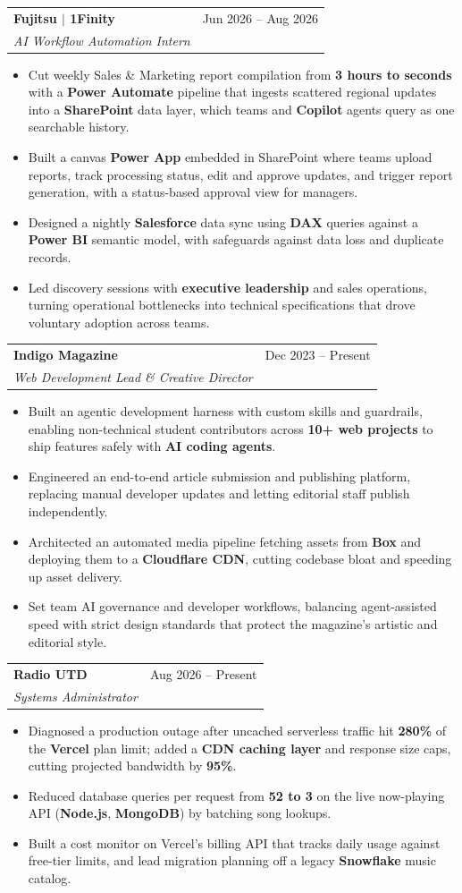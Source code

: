 \documentclass[letterpaper,11pt]{article}
\makeatletter
\newcommand{\resumeItem}[1]{\item\small{{#1 \vspace{-2pt}}}}
\newcommand{\resumeSubheading}[4]{
  \vspace{-2pt}\item
    \begin{tabular*}{0.97\textwidth}[t]{l@{\extracolsep{\fill}}r}
      \textbf{#1} & #2 \\
      \textit{\small#3} & \textit{\small #4} \\
    \end{tabular*}\vspace{-7pt}
}
\newcommand{\resumeItemListStart}{\begin{itemize}}
\newcommand{\resumeItemListEnd}{\end{itemize}\vspace{-5pt}}
\makeatother
\begin{document}
    \resumeSubheading
      {Fujitsu $|$ 1Finity}{Jun 2026 -- Aug 2026}
      {AI Workflow Automation Intern}{}
      \resumeItemListStart
        \resumeItem{Cut weekly Sales \& Marketing report compilation from \textbf{3 hours to seconds} with a \textbf{Power Automate} pipeline that ingests scattered regional updates into a \textbf{SharePoint} data layer, which teams and \textbf{Copilot} agents query as one searchable history.}
        \resumeItem{Built a canvas \textbf{Power App} embedded in SharePoint where teams upload reports, track processing status, edit and approve updates, and trigger report generation, with a status-based approval view for managers.}
        \resumeItem{Designed a nightly \textbf{Salesforce} data sync using \textbf{DAX} queries against a \textbf{Power BI} semantic model, with safeguards against data loss and duplicate records.}
        \resumeItem{Led discovery sessions with \textbf{executive leadership} and sales operations, turning operational bottlenecks into technical specifications that drove voluntary adoption across teams.}
      \resumeItemListEnd

    \resumeSubheading
      {Indigo Magazine}{Dec 2023 -- Present}
      {Web Development Lead \& Creative Director}{}
      \resumeItemListStart
        \resumeItem{Built an agentic development harness with custom skills and guardrails, enabling non-technical student contributors across \textbf{10+ web projects} to ship features safely with \textbf{AI coding agents}.}
        \resumeItem{Engineered an end-to-end article submission and publishing platform, replacing manual developer updates and letting editorial staff publish independently.}
        \resumeItem{Architected an automated media pipeline fetching assets from \textbf{Box} and deploying them to a \textbf{Cloudflare CDN}, cutting codebase bloat and speeding up asset delivery.}
        \resumeItem{Set team AI governance and developer workflows, balancing agent-assisted speed with strict design standards that protect the magazine's artistic and editorial style.}
      \resumeItemListEnd

    \resumeSubheading
      {Radio UTD}{Aug 2026 -- Present}
      {Systems Administrator}{}
      \resumeItemListStart
        \resumeItem{Diagnosed a production outage after uncached serverless traffic hit \textbf{280\%} of the \textbf{Vercel} plan limit; added a \textbf{CDN caching layer} and response size caps, cutting projected bandwidth by \textbf{95\%}.}
        \resumeItem{Reduced database queries per request from \textbf{52 to 3} on the live now-playing API (\textbf{Node.js}, \textbf{MongoDB}) by batching song lookups.}
        \resumeItem{Built a cost monitor on Vercel's billing API that tracks daily usage against free-tier limits, and lead migration planning off a legacy \textbf{Snowflake} music catalog.}
      \resumeItemListEnd
\end{document}
